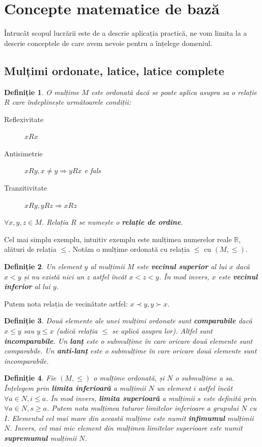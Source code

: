 \documentclass[12pt, a4paper, twoside, romanian]{teza-upb}
\newtheorem{defn}{Definiție}
\begin{document}
  \section{Concepte matematice de bază}
    Întrucât scopul lucrării este de a descrie aplicația practică, ne vom limita la a descrie conceptele de care avem nevoie pentru a înțelege domeniul.
    \subsection{Mulțimi ordonate, latice, latice complete}
    \begin{defn}
      O mulțime $M$ este ordonată dacă se poate aplica asupra sa o relație $R$ care îndeplinește următoarele condiții:
      \begin{description}
        \item [Reflexivitate] $xRx$
        \item [Antisimetrie] $xRy, x \neq y \Rightarrow yRx$ e fals
        \item [Tranzitivitate] $xRy, yRz \Rightarrow xRz$
      \end{description}
      $\forall x, y,z \in M$. Relația $R$ se numește o \textbf{relație de ordine}.
    \end{defn}

    Cel mai simplu exemplu, intuitiv exemplu este mulțimea numerelor reale $ \mathbb{R}$, alături de relația $\le$. Notăm o mulțime ordonată cu relația $\le$ cu $(M, \le)$.

    \begin{defn}
      Un element $y$ al mulțimii $M$ este \textbf{vecinul superior} al lui $x$ dacă $x < y$ și nu există nici un $z$ astfel încât $x < z < y$. În mod invers, $x$ este \textbf{vecinul inferior} al lui $y$.
    \end{defn}

    Putem nota relația de vecinătate astfel: $x \prec y, y \succ x$.

    \begin{defn}
      Două elemente ale unei mulțimi ordonate sunt \textbf{comparabile} dacă $x \le y$ sau $y \le x$ (adică relația $\le$ se aplică asupra lor). Altfel sunt \textbf{incomparabile}. Un \textbf{lanț} este o submulțime în care oricare două elemente sunt comparabile. Un \textbf{anti-lanț} este o submulțime în care oricare două elemente sunt incomparabile.
    \end{defn}

    \begin{defn}
      Fie $(M, \le)$ o mulțime ordonată, și $N$ o submulțime a sa. Înțelegem prin \textbf{limita inferioară} a mulțimii $N$ un element $i$ astfel încât $\forall a \in N, i \le a$. În mod invers, \textbf{limita superioară} a mulțimii $s$ este definită prin $\forall a \in N, s \ge a$.
      Putem nota mulțimea tuturor limitelor inferioare a grupului $N$ cu $I$. Elementul cel mai mare din această mulțime este numit \textbf{infimumul} mulțimii $N$. Invers, cel mai mic element din mulțimea limitelor superioare este numit \textbf{supremumul} mulțimii $N$.
    \end{defn}
\end{document}
